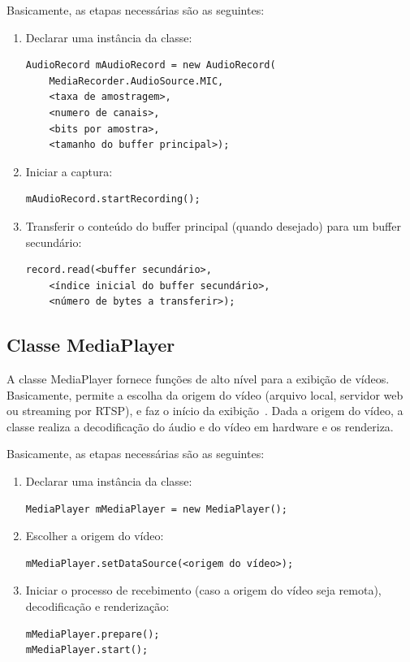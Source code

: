 \documentclass{acm_proc_article-sp}
\begin{document}
Basicamente, as etapas necessárias são as seguintes:
\begin{enumerate}
 \item Declarar uma instância da classe:
  \begin{verbatim}
AudioRecord mAudioRecord = new AudioRecord(
    MediaRecorder.AudioSource.MIC, 
    <taxa de amostragem>,
    <numero de canais>,
    <bits por amostra>,
    <tamanho do buffer principal>);
  \end{verbatim}
 \item Iniciar a captura:
  \begin{verbatim}
mAudioRecord.startRecording();
  \end{verbatim}
 \item Transferir o conteúdo do buffer principal (quando desejado) para um buffer secundário:
  \begin{verbatim}
record.read(<buffer secundário>,
    <índice inicial do buffer secundário>,
    <número de bytes a transferir>);
  \end{verbatim}
\end{enumerate}

\subsection{Classe MediaPlayer}
A classe MediaPlayer fornece funções de alto nível para a exibição de vídeos. Basicamente, permite a escolha da origem do vídeo (arquivo local, servidor web ou streaming por RTSP), e faz o início da exibição~\cite{pro_android}. Dada a origem do vídeo, a classe realiza a decodificação do áudio e do vídeo em hardware e os renderiza.

Basicamente, as etapas necessárias são as seguintes:
\begin{enumerate}
 \item Declarar uma instância da classe:
  \begin{verbatim}
MediaPlayer mMediaPlayer = new MediaPlayer();
  \end{verbatim}
 \item Escolher a origem do vídeo:
  \begin{verbatim}
mMediaPlayer.setDataSource(<origem do vídeo>);
  \end{verbatim}
 \item Iniciar o processo de recebimento (caso a origem do vídeo seja remota), decodificação e renderização:
  \begin{verbatim}
mMediaPlayer.prepare();
mMediaPlayer.start();
  \end{verbatim}
\end{enumerate}
\end{document}
